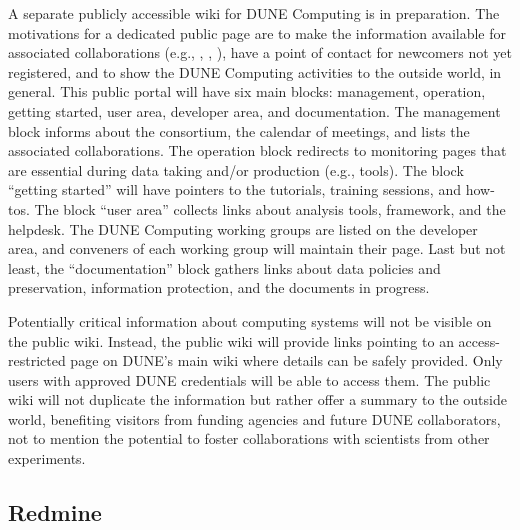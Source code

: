 \documentclass[../main-v1.tex]{subfiles}
\begin{document}
A separate publicly accessible wiki for DUNE Computing is in preparation. The motivations for a dedicated public page are to make the information available for associated collaborations (e.g., , , ), have a point of contact for newcomers not yet registered, and to show the DUNE Computing activities to the outside world, in general. This public portal will have six main blocks: management, operation, getting started, user area, developer area, and documentation. The management block informs about the consortium, the calendar of meetings, and lists the associated collaborations. The operation block redirects to monitoring pages that are essential during data taking and/or production (e.g.,  tools). The block ``getting started'' will have pointers to the tutorials, training sessions, and how-tos. The block ``user area'' collects links about analysis tools, framework, and %
the  helpdesk. The DUNE Computing working groups are listed on the developer area, and conveners of each working group will maintain their page. Last but not least, the ``documentation'' block gathers links about data policies and preservation, information protection, and the documents in progress.

Potentially critical information about computing systems will not be visible on the public wiki. Instead, the public wiki will provide links pointing to an access-restricted page on DUNE’s main wiki where details can be safely provided. Only users with approved DUNE credentials will be able to access them. The public wiki will not duplicate the information but rather offer a summary to the outside world, benefiting visitors from funding agencies and future DUNE %
collaborators, not to mention the potential to foster collaborations with scientists from other experiments.


\subsection{Redmine}
\end{document}
